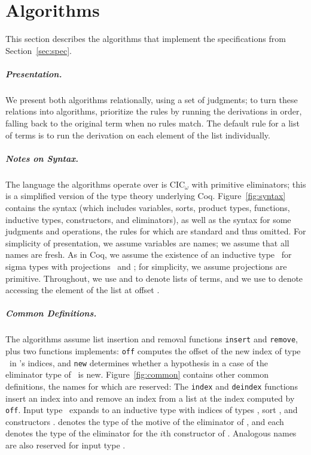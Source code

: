 \section{Algorithms}
\label{sec:alg}

This section describes the algorithms that implement the specifications
from Section~\ref{sec:spec}.

\subparagraph*{Presentation.} We present both algorithms relationally, using a set of judgments;
to turn these relations into algorithms, prioritize the rules by running the derivations in
order, falling back to the original term when no rules match.
The default rule for a list of terms is to run the derivation on each element of the list individually. 

\subparagraph*{Notes on Syntax.} The language the algorithms operate over is CIC$_{\omega}$ with primitive eliminators;
this is a simplified version of the type theory underlying Coq. Figure~\ref{fig:syntax}
contains the syntax (which includes variables, sorts, product types,
functions, inductive types, constructors, and eliminators),
as well as the syntax for some judgments and operations,
the rules for which are standard and thus omitted. 
For simplicity of presentation, we assume variables are names; 
we assume that all names are fresh.
As in Coq, we assume the existence of
an inductive type \sigT\ for sigma types with projections \Pil\ and \Pir;
for simplicity, we assume projections are primitive.
Throughout, we use  and  to denote
lists of terms, and we use  to denote accessing the element of the list  at offset .

\subparagraph*{Common Definitions.}
The algorithms assume list insertion and removal functions \lstinline{insert} and \lstinline{remove},
plus two functions \toolnameb implements:
\lstinline{off} computes the offset of the new index of type \IB\ in \B's indices,
and \lstinline{new} determines whether a hypothesis in a case of the eliminator type of \B\ is new.
Figure~\ref{fig:common} contains other common definitions, the names for which are reserved:
The \lstinline{index} and \lstinline{deindex} functions insert an index into and remove an index from a list
at the index computed by \lstinline{off}.
Input type \Aa\ expands to an inductive type with indices %
of types , sort , and constructors
.
 denotes the type of the motive of the eliminator of \Aa,
and each  denotes the type of the eliminator for the $i$th constructor of \Aa.
Analogous names are also reserved for input type \B.

